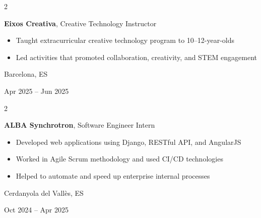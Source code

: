 \documentclass[10pt, letterpaper]{article}
\newenvironment{highlights}{
    \begin{itemize}[
        topsep=0.10 cm,
        parsep=0.10 cm,
        partopsep=0pt,
        itemsep=0pt,
        leftmargin=0.4 cm + 10pt
    ]
}{
    \end{itemize}
} %
\newenvironment{twocolentry}[2][]{
    \onecolentry
    \def\secondColumn{#2}
    \setcolumnwidth{\fill, 4.5 cm}
    \begin{paracol}{2}
}{
    \switchcolumn \raggedleft \secondColumn
    \end{paracol}
    \endonecolentry
} %
\begin{document}
        \vspace{0.2 cm}

        \begin{twocolentry}{
            Barcelona, ES

            Apr 2025 – Jun 2025
        }
            \textbf{Eixos Creativa}, Creative Technology Instructor
            \begin{highlights}
                \item Taught extracurricular creative technology program to 10–12-year-olds
                \item Led activities that promoted collaboration, creativity, and STEM engagement
            \end{highlights}
        \end{twocolentry}

        \vspace{0.2 cm}
        
        \begin{twocolentry}{
            Cerdanyola del Vallès, ES

            Oct 2024 – Apr 2025
        }
            \textbf{ALBA Synchrotron}, Software Engineer Intern
            \begin{highlights}
                \item Developed web applications using Django, RESTful API, and AngularJS
                \item Worked in Agile Scrum methodology and used CI/CD technologies
                \item Helped to automate and speed up enterprise internal processes
            \end{highlights}
        \end{twocolentry}

        \vspace{0.2 cm}
%
%
%
\end{document}
